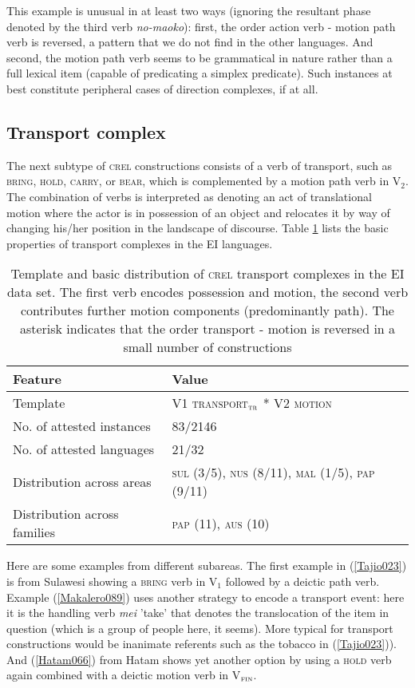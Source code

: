 This example is unusual in at least two ways (ignoring the resultant phase denoted by the third verb \textit{no-maoko}): first, the order action verb - motion path verb is reversed, a pattern that we do not find in the other languages. And second, the motion path verb seems to be grammatical in nature rather than a full lexical item (capable of predicating a simplex predicate). Such instances at best constitute peripheral cases of direction complexes, if at all.

\subsection{Transport complex} \label{sec:transport}

The next subtype of \textsc{crel} constructions consists of a verb of transport, such as \textsc{bring}, \textsc{hold}, \textsc{carry}, or \textsc{bear}, which is complemented by a motion path verb in V$_2$. The combination of verbs is interpreted as denoting an act of translational motion where the actor is in possession of an object and relocates it by way of changing his/her position in the landscape of discourse. Table \ref{table:basiccreltransport} lists the basic properties of transport complexes in the EI languages. 

\begin{table}


\begin{tabular}{ll}
\lsptoprule
Feature&Value\tabularnewline
\hline
Template&V1 \textsc{transport$_{\textsc{tr}}$} * V2 \textsc{motion}\tabularnewline
No. of attested instances& 83/2146 \tabularnewline
No. of attested languages& 21/32 \tabularnewline
Distribution across areas& \textsc{sul} (3/5), \textsc{nus} (8/11), \textsc{mal} (1/5), \textsc{pap} (9/11) \tabularnewline
Distribution across families& \textsc{pap} (11), \textsc{aus} (10) \tabularnewline
\hline
\end{tabular}
\caption[Template and basic distribution of \textsc{crel} transport complexes]{Template and basic distribution of \textsc{crel} transport complexes in the EI data set. The first verb encodes possession and motion, the second verb contributes further motion components (predominantly path). The asterisk indicates that the order transport - motion is reversed in a small number of constructions}
\label{table:basiccreltransport}
\end{table}
 

Here are some examples from different subareas. The first example in (\ref{Tajio023}) is from Sulawesi showing a \textsc{bring} verb in V$_{1}$ followed by a deictic path verb. Example (\ref{Makalero089}) uses another strategy to encode a transport event: here it is the handling verb \textit{mei} 'take' that denotes the translocation of the item in question (which is a group of people here, it seems). More typical for transport constructions would be inanimate referents such as the tobacco in (\ref{Tajio023})). And (\ref{Hatam066}) from Hatam shows yet another option by using a \textsc{hold} verb again combined with a deictic motion verb in V$_{\textsc{fin}}$.

